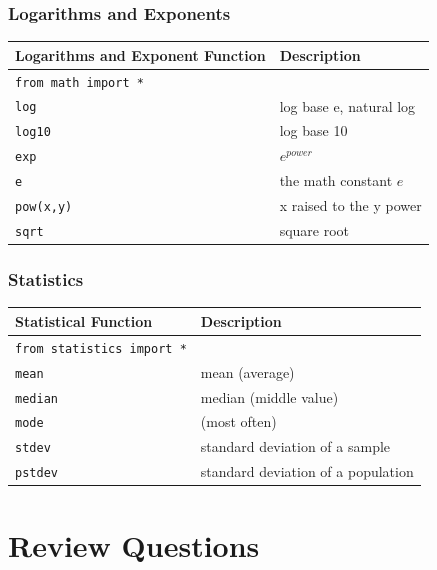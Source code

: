 \documentclass{book}
\begin{document}
\subsubsection{Logarithms and Exponents}\label{logarithms-and-exponents}

\begin{longtable}[]{@{}ll@{}}
\toprule
Logarithms and Exponent Function & Description\tabularnewline
\midrule
\endhead
\lstinline!from math import *! &\tabularnewline
\lstinline!log! & log base e, natural log\tabularnewline
\lstinline!log10! & log base 10\tabularnewline
\lstinline!exp! & \(e^{power}\)\tabularnewline
\lstinline!e! & the math constant \(e\)\tabularnewline
\lstinline!pow(x,y)! & x raised to the y power\tabularnewline
\lstinline!sqrt! & square root\tabularnewline
\bottomrule
\end{longtable}

\subsubsection{Statistics}\label{statistics}

\begin{longtable}[]{@{}ll@{}}
\toprule
Statistical Function & Description\tabularnewline
\midrule
\endhead
\lstinline!from statistics import *! &\tabularnewline
\lstinline!mean! & mean (average)\tabularnewline
\lstinline!median! & median (middle value)\tabularnewline
\lstinline!mode! & (most often)\tabularnewline
\lstinline!stdev! & standard deviation of a sample\tabularnewline
\lstinline!pstdev! & standard deviation of a population\tabularnewline
\bottomrule
\end{longtable}
    




    
        \section{Review Questions}\label{review-questions}
    
\end{document}
